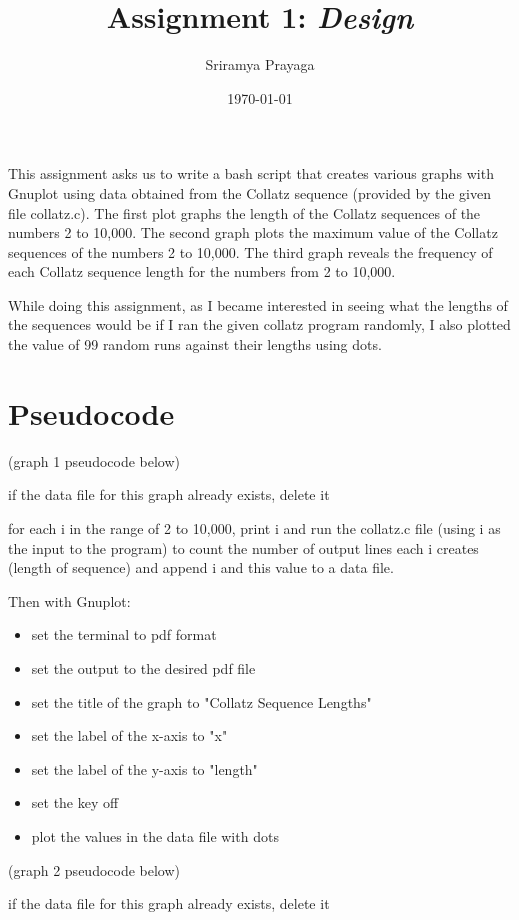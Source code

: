 \documentclass[11pt]{article}
\title{Assignment 1: \emph{Design}}
\author{Sriramya Prayaga}
\date{\today}
\begin{document}
\maketitle

This assignment asks us to write a bash script that creates various 
graphs with Gnuplot using data obtained from the Collatz sequence 
(provided by the given file collatz.c). The first plot graphs the length
of the Collatz sequences of the numbers 2 to 10,000. The second graph 
plots the maximum value of the Collatz sequences of the numbers
2 to 10,000. The third graph reveals the frequency of each Collatz 
sequence length for the numbers from 2 to 10,000. 

While doing this assignment, as I became interested in seeing what the lengths
of the sequences would be if I ran the given collatz program randomly, I also 
plotted the value of 99 random runs against their lengths using dots.

\section{Pseudocode}

(graph 1 pseudocode below)

if the data file for this graph already exists, delete it

for each i in the range of 2 to 10,000, print i and run the collatz.c file 
(using i as the input to the program) to count the number of output lines 
each i creates (length of sequence) and append i and this value to a data file.


Then with Gnuplot:


      \begin{itemize}
       \item set the terminal to pdf format
       \item set the output to the desired pdf file
       \item set the title of the graph to "Collatz Sequence Lengths"
       \item set the label of the x-axis to "x"
       \item set the label of the y-axis to "length"
       \item set the key off
       \item plot the values in the data file with dots
     \end{itemize}


(graph 2 pseudocode below)

if the data file for this graph already exists, delete it
\end{document}
